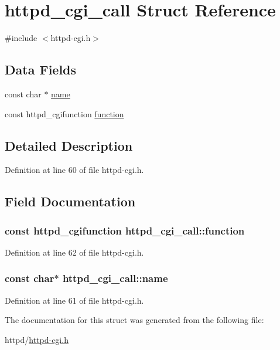 \hypertarget{structhttpd__cgi__call}{
\section{httpd\_\-cgi\_\-call Struct Reference}
\label{structhttpd__cgi__call}
}


{\ttfamily \#include $<$httpd-\/cgi.h$>$}

\subsection*{Data Fields}
\begin{DoxyCompactItemize}
\item 
const char $\ast$ \hyperlink{structhttpd__cgi__call_a9a84c69ec5a4705ccb1ca99fcd120add}{name}
\item 
const httpd\_\-cgifunction \hyperlink{structhttpd__cgi__call_a1513a9e88921750d2a611b518f6fc207}{function}
\end{DoxyCompactItemize}


\subsection{Detailed Description}


Definition at line 60 of file httpd-\/cgi.h.



\subsection{Field Documentation}
\hypertarget{structhttpd__cgi__call_a1513a9e88921750d2a611b518f6fc207}{
\subsubsection[{function}]{\setlength{\rightskip}{0pt plus 5cm}const httpd\_\-cgifunction {\bf httpd\_\-cgi\_\-call::function}}}
\label{structhttpd__cgi__call_a1513a9e88921750d2a611b518f6fc207}


Definition at line 62 of file httpd-\/cgi.h.

\hypertarget{structhttpd__cgi__call_a9a84c69ec5a4705ccb1ca99fcd120add}{
\subsubsection[{name}]{\setlength{\rightskip}{0pt plus 5cm}const char$\ast$ {\bf httpd\_\-cgi\_\-call::name}}}
\label{structhttpd__cgi__call_a9a84c69ec5a4705ccb1ca99fcd120add}


Definition at line 61 of file httpd-\/cgi.h.



The documentation for this struct was generated from the following file:\begin{DoxyCompactItemize}
\item 
httpd/\hyperlink{httpd-cgi_8h}{httpd-\/cgi.h}\end{DoxyCompactItemize}
